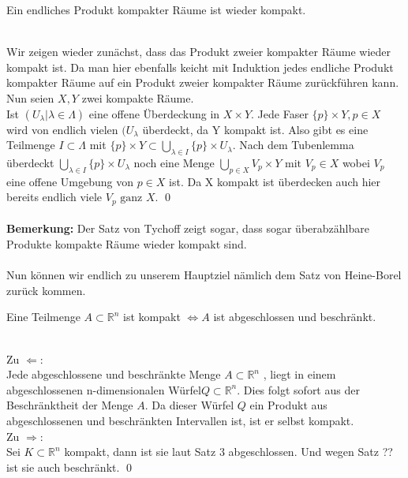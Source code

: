 \begin{Satz}
	Ein endliches Produkt kompakter Räume ist wieder kompakt.
\end{Satz}
	\\
	Wir zeigen wieder zunächst, dass das Produkt zweier kompakter Räume wieder kompakt ist. Da man hier ebenfalls keicht mit Induktion jedes endliche Produkt kompakter Räume 
	auf ein Produkt zweier kompakter Räume zurückführen kann. \\
	Nun seien \(X, Y\) zwei kompakte Räume.\\
	Ist \((U_{\lambda} | \lambda \in \Lambda) \) eine offene Überdeckung in \(X \times Y \). Jede Faser \( \{p\} \times Y, p \in X \) wird von endlich vielen \((U_{\lambda} \) überdeckt,
	da Y kompakt ist. Also gibt es eine Teilmenge \( I \subset \Lambda \) mit \( \{p\} \times Y \subset \bigcup_{ \lambda \in I } \{p\} \times U_{\lambda} \). 
	Nach dem Tubenlemma überdeckt \( \bigcup_{ \lambda \in I } \{p\} \times U_{\lambda} \) noch eine Menge \(\bigcup_{ p \in X } V_{p} \times Y \mbox{ mit } V_{p} \in X \) 
	wobei \( V_{p} \) eine offene Umgebung von \( p \in X \) ist. Da X kompakt ist überdecken auch hier bereits endlich viele \(V_{p} \mbox{ ganz } X \). 
	\qed\\
	\\
	{\bf Bemerkung:} Der Satz von Tychoff zeigt sogar, dass sogar überabzählbare Produkte kompakte Räume wieder kompakt sind. \\
	\\
	Nun können wir endlich zu unserem Hauptziel nämlich dem Satz von Heine-Borel zurück kommen.
	\begin{Satz}
		Eine Teilmenge  \( A \subset \mathbb{R}^n \) ist kompakt \(\Leftrightarrow A \) ist abgeschlossen und beschränkt.
	\end{Satz}
	 \\
		Zu \(\Leftarrow \): \\
		Jede abgeschlossene und beschränkte Menge \(A \subset\mathbb{R}^n \) , liegt in einem abgeschlossenen n-dimensionalen Würfel\( Q \subset \mathbb{R}^n \). Dies folgt sofort aus der 
		Beschränktheit der Menge \(A\). Da dieser Würfel \( Q \) ein Produkt aus abgeschlossenen und beschränkten Intervallen ist, ist er selbst kompakt.
		\\
		Zu \(\Rightarrow \): \\
		Sei \( K \subset \mathbb{R}^n \) kompakt, dann ist sie laut Satz 3 abgeschlossen. Und wegen Satz ?? ist sie auch beschränkt.
	\qed \\

